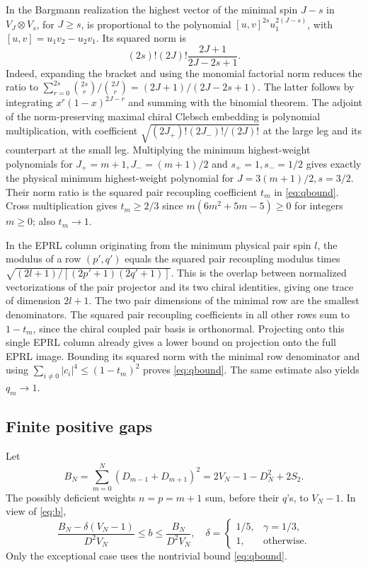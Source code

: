 \documentclass[11pt]{article}
\theoremstyle{remark}
\begin{document}
In the Bargmann realization the highest vector of the minimal spin \(J-s\) in \(V_J\otimes V_s\), for \(J\ge s\), is proportional to the polynomial \([u,v]^{2s}u_1^{2(J-s)}\), with \([u,v]=u_1v_2-u_2v_1\). Its squared norm is
\[
 (2s)!(2J)!\frac{2J+1}{2J-2s+1}.
\]
Indeed, expanding the bracket and using the monomial factorial norm reduces the ratio to \(\sum_{r=0}^{2s}\binom{2s}{r}/\binom{2J}{r}=(2J+1)/(2J-2s+1)\). The latter follows by integrating \(x^r(1-x)^{2J-r}\) and summing with the binomial theorem. The adjoint of the norm-preserving maximal chiral Clebsch embedding is polynomial multiplication, with coefficient \(\sqrt{(2J_+)!(2J_-)!/(2J)!}\) at the large leg and its counterpart at the small leg. Multiplying the minimum highest-weight polynomials for \(J_+=m+1,J_-=(m+1)/2\) and \(s_+=1,s_-=1/2\) gives exactly the physical minimum highest-weight polynomial for \(J=3(m+1)/2,s=3/2\). Their norm ratio is the squared pair recoupling coefficient \(t_m\) in \eqref{eq:qbound}. Cross multiplication gives \(t_m\ge2/3\) since \(m(6m^2+5m-5)\ge0\) for integers \(m\ge0\); also \(t_m\to1\).

In the EPRL column originating from the minimum physical pair spin \(l\), the modulus of a row \((p',q')\) equals the squared pair recoupling modulus times \(\sqrt{(2l+1)/[(2p'+1)(2q'+1)]}\). This is the overlap between normalized vectorizations of the pair projector and its two chiral identities, giving one trace of dimension \(2l+1\). The two pair dimensions of the minimal row are the smallest denominators. The squared pair recoupling coefficients in all other rows sum to \(1-t_m\), since the chiral coupled pair basis is orthonormal. Projecting onto this single EPRL column already gives a lower bound on projection onto the full EPRL image. Bounding its squared norm with the minimal row denominator and using \(\sum_{i\ne0}|c_i|^4\leq(1-t_m)^2\) proves \eqref{eq:qbound}. The same estimate also yields \(q_m\to1\).

\subsection{Finite positive gaps}

Let
\begin{equation}\label{eq:B}
 B_N=\sum_{m=0}^N(D_{m-1}+D_{m+1})^2
     =2V_N-1-D_N^2+2S_2 .
\end{equation}
The possibly deficient weights \(n=p=m+1\) sum, before their \(q\)'s, to \(V_N-1\). In view of \eqref{eq:b},
\[
 \frac{B_N-\delta(V_N-1)}{D^2V_N}
 \le b\le \frac{B_N}{D^2V_N},
 \quad
 \delta=\begin{cases}
 1/5,&\gamma=1/3,\\
 1,&\text{otherwise}.
 \end{cases}
\]
Only the exceptional case uses the nontrivial bound \eqref{eq:qbound}.
\end{document}
